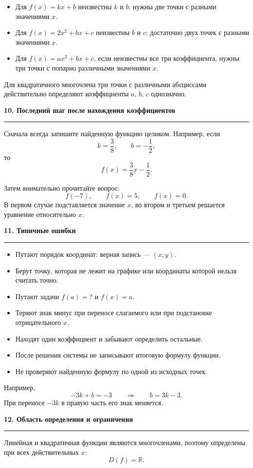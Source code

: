 \documentclass[a4paper,12pt]{article}
\newcommand{\topic}[1]{%
  \Needspace{8\baselineskip}%
  \par\vspace{0.8em}
  {\large\bfseries\color{darkaccent}#1}\par
  \vspace{0.2em}
  {\color{accent}\rule{\linewidth}{0.6pt}}\par
  \vspace{0.25em}
}
\begin{document}
\begin{itemize}
\item Для \(f(x)=kx+b\) неизвестны \(k\) и \(b\): нужны две точки с разными значениями \(x\).
\item Для \(f(x)=2x^2+bx+c\) неизвестны \(b\) и \(c\): достаточно двух точек с разными значениями \(x\).
\item Для \(f(x)=ax^2+bx+c\), если неизвестны все три коэффициента, нужны три точки с попарно различными значениями \(x\).
\end{itemize}

Для квадратичного многочлена три точки с различными абсциссами действительно определяют коэффициенты \(a\), \(b\), \(c\) однозначно.

\topic{10. Последний шаг после нахождения коэффициентов}

Сначала всегда запишите найденную функцию целиком. Например, если
\[
k=\frac38,
\qquad
b=-\frac12,
\]
то
\[
f(x)=\frac38x-\frac12.
\]

Затем внимательно прочитайте вопрос:
\[
f(-7),
\qquad
f(x)=5,
\qquad
f(x)=0.
\]
В первом случае подставляется значение \(x\), во втором и третьем решается уравнение относительно \(x\).

\topic{11. Типичные ошибки}

\begin{itemize}
\item Путают порядок координат: верная запись --- \((x;y)\).
\item Берут точку, которая не лежит на графике или координаты которой нельзя считать точно.
\item Путают задачи \(f(a)=?\) и \(f(x)=a\).
\item Теряют знак минус при переносе слагаемого или при подстановке отрицательного \(x\).
\item Находят один коэффициент и забывают определить остальные.
\item После решения системы не записывают итоговую формулу функции.
\item Не проверяют найденную формулу по одной из исходных точек.
\end{itemize}

Например,
\[
-3k+b=-3
\qquad\Longrightarrow\qquad
b=3k-3.
\]
При переносе \(-3k\) в правую часть его знак меняется.

\topic{12. Область определения и ограничения}

Линейная и квадратичная функции являются многочленами, поэтому определены при всех действительных \(x\):
\[
D(f)=\mathbb{R}.
\]
\end{document}
